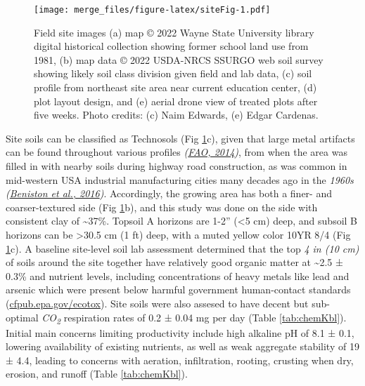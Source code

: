 \documentclass[
  12pt,
]{article}
\begin{document}
\begin{figure}
\centering
\texttt{[image: merge\_files/figure-latex/siteFig-1.pdf]}
\caption{\label{fig:siteFig}Field site images (a) map © 2022 Wayne State University library digital historical collection showing former school land use from 1981, (b) map data © 2022 USDA-NRCS SSURGO web soil survey showing likely soil class division given field and lab data, (c) soil profile from northeast site area near current education center, (d) plot layout design, and (e) aerial drone view of treated plots after five weeks. Photo credits: (c) Naim Edwards, (e) Edgar Cardenas.}
\end{figure}

Site soils can be classified as Technosols (Fig \ref{fig:siteFig}c), given that large metal artifacts can be found throughout various profiles \emph{(\protect\hyperlink{ref-fao14}{FAO, 2014})}, from when the area was filled in with nearby soils during highway road construction, as was common in mid-western USA industrial manufacturing cities many decades ago in the \emph{1960s} \emph{(\protect\hyperlink{ref-beniston16}{Beniston et al., 2016})}.
Accordingly, the growing area has both a finer- and coarser-textured side (Fig \ref{fig:siteFig}b),
and this study was done on the side with consistent clay of \textasciitilde37\%.
Topsoil A horizons are 1-2'' (\textless5 cm) deep, and subsoil B horizons can be \textgreater30.5 cm (1 ft) deep, with a muted yellow color 10YR 8/4 (Fig \ref{fig:siteFig}c).
A baseline site-level soil lab assessment determined that the top \emph{4 in (10 cm)} of soils around the site together have relatively good organic matter at
\textasciitilde2.5 ±
0.3\%
and nutrient levels, including concentrations of heavy metals like lead and arsenic which were present below harmful government human-contact standards (\url{cfpub.epa.gov/ecotox}).
Site soils were also assesed to have decent but sub-optimal \emph{CO\textsubscript{2}} respiration rates of
0.2 ±
0.04 mg per day
(Table \ref{tab:chemKbl}).
Initial main concerns limiting productivity include high alkaline pH of
8.1 ±
0.1,
lowering availability of existing nutrients, as well as weak aggregate stability of
19 ±
4.4,
leading to concerns with aeration, infiltration, rooting, crusting when dry, erosion, and runoff (Table \ref{tab:chemKbl}).
\end{document}
